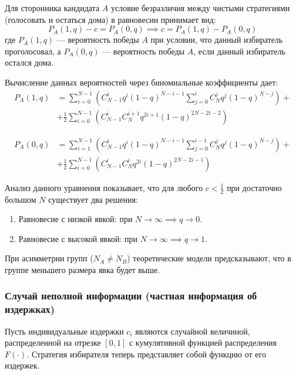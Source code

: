 Для сторонника кандидата $A$ условие безразличия между чистыми стратегиями (голосовать и остаться дома) в равновесии принимает вид:
\begin{equation}
P_A(1, q) - c = P_A(0, q) \implies c = P_A(1, q) - P_A(0, q)
\end{equation}
где $P_A(1, q)$ — вероятность победы $A$ при условии, что данный избиратель проголосовал, а $P_A(0, q)$ — вероятность победы $A$, если данный избиратель остался дома. 

Вычисление данных вероятностей через биномиальные коэффициенты дает:
\begin{align}
P_A(1, q) &= \sum_{i=0}^{N-1} \left( C_{N-1}^i q^i (1 - q)^{N-i-1} \sum_{j=0}^{i} C_N^j q^j (1 - q)^{N-j} \right) + \nonumber \\
&+ \frac{1}{2} \sum_{i=0}^{N-1} \left( C_{N-1}^i C_N^{i+1} q^{2i+1} (1 - q)^{2N-2i-2} \right)
\end{align}

\begin{align}
P_A(0, q) &= \sum_{i=1}^{N-1} \left( C_{N-1}^i q^i (1 - q)^{N-i-1} \sum_{j=0}^{i-1} C_N^j q^j (1 - q)^{N-j} \right) + \nonumber \\
&+ \frac{1}{2} \sum_{i=0}^{N-1} \left( C_{N-1}^i C_N^i q^{2i} (1 - q)^{2N-2i-1} \right)
\end{align}

Анализ данного уравнения показывает, что для любого $c < \frac{1}{2}$ при достаточно большом $N$ существует два решения:
\begin{enumerate}
    \item Равновесие с низкой явкой: при $N \to \infty \implies q \to 0$.
    \item Равновесие с высокой явкой: при $N \to \infty \implies q \to 1$.
\end{enumerate}
При асимметрии групп ($N_A \neq N_B$) теоретические модели предсказывают, что в группе меньшего размера явка будет выше.

\subsubsection{Случай неполной информации (частная информация об издержках)}

Пусть индивидуальные издержки $c_i$ являются случайной величиной, распределенной на отрезке $[0, 1]$ с кумулятивной функцией распределения $F(\cdot)$. Стратегия избирателя теперь представляет собой функцию от его издержек. 

